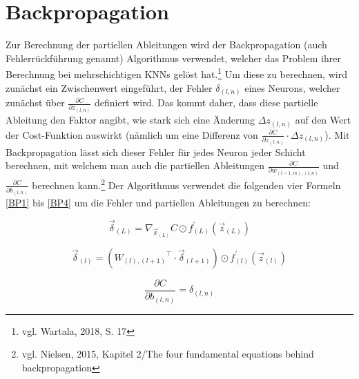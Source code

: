 \documentclass[a4paper,12pt,ngerman,oneside]{scrreprt}	%
\begin{document}
		\section{Backpropagation} \label{Backpropagation}
			Zur Berechnung der partiellen Ableitungen wird der Backpropagation (auch Fehlerrückführung genannt) Algorithmus verwendet, welcher das Problem ihrer Berechnung bei mehrschichtigen KNNs gelöst hat.\footnote{vgl. Wartala, 2018, S. 17} Um diese zu berechnen, wird zunächst ein Zwischenwert eingeführt, der Fehler $\delta_{(l,n)}$ eines Neurons, welcher zunächst über $\frac{\partial C}{\partial z_{(l,n)}}$ definiert wird. Das kommt daher, dass diese partielle Ableitung den Faktor angibt, wie stark sich eine Änderung $\Delta z_{(l,n)}$ auf den Wert der Cost-Funktion auswirkt (nämlich um eine Differenz von $\frac{\partial C}{\partial z_{(l,n)}} \cdot \Delta z_{(l,n)}$). Mit Backpropagation lässt sich dieser Fehler für jedes Neuron jeder Schicht berechnen, mit welchem man auch die partiellen Ableitungen $\frac{\partial C}{\partial w_{(l-1,m),(l,n)}}$ und $\frac{\partial C}{\partial b_{(l,n)}}$ berechnen kann.\footnote{vgl. Nielsen, 2015, Kapitel 2/The four fundamental equations behind backpropagation} Der Algorithmus verwendet die folgenden vier Formeln \ref{BP1} bis \ref{BP4} um die Fehler und partiellen Ableitungen zu berechnen: 

			\begin{equation}\label{BP1}
				\vec{\delta}_{(L)} = \nabla_{\vec{x}_{(L)}}C \odot f_{(L)}^{\prime} (\vec{z}_{(L)})
			\end{equation}
			
			\begin{equation}\label{BP2}
				\vec{\delta}_{(l)} = ({W_{(l),(l+1)}}^\intercal \cdot \vec{\delta}_{(l+1)}) \odot f_{(l)}^{\prime} (\vec{z}_{(l)})
			\end{equation}
			
			\begin{equation}\label{BP3}
				\frac{\partial C}{\partial b_{(l,n)}} = \delta_{(l,n)}
			\end{equation}
			
\end{document}
